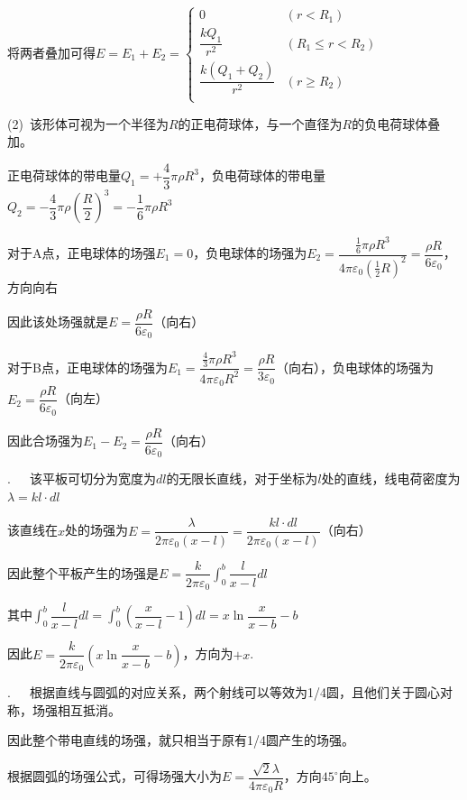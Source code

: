 将两者叠加可得$
    E=E_1+E_2=\begin{cases}
    	0&		\left( r<R_1 \right)\\[3pt]
        \dfrac{kQ_1}{r^2}&		\left( R_1\leq r<R_2 \right)\\[6pt]
    	\dfrac{k(Q_1+Q_2)}{r^2}&		\left( r\geq R_2 \right)\\
    \end{cases}
    $

(2)~该形体可视为一个半径为$R$的正电荷球体，与一个直径为$R$的负电荷球体叠加。

正电荷球体的带电量$Q_1=+\dfrac{4}{3}\pi \rho R^3$，负电荷球体的带电量$Q_2=-\dfrac{4}{3}\pi \rho \left(\dfrac{R}{2}\right)^3=-\dfrac{1}{6}\pi \rho R^3$

对于A点，正电球体的场强$E_1=0$，负电球体的场强为$E_2=\dfrac{\frac{1}{6}\pi \rho R^3}{4\pi\varepsilon_0 (\frac{1}{2}R)^2}=\dfrac{\rho R}{6\varepsilon_0}$，方向向右

因此该处场强就是$E=\dfrac{\rho R}{6\varepsilon_0}$（向右）

对于B点，正电球体的场强为$E_1=\dfrac{\frac{4}{3}\pi\rho R^3}{4\pi \varepsilon_0 R^2}=\dfrac{\rho R}{3\varepsilon_0}$（向右），负电球体的场强为$E_2=\dfrac{\rho R}{6\varepsilon_0}$（向左）

因此合场强为$E_1-E_2=\dfrac{\rho R}{6\varepsilon_0}$（向右）

\noindent\hdashrule{\textwidth}{1pt}{1pt}

.~~~该平板可切分为宽度为$dl$的无限长直线，对于坐标为$l$处的直线，线电荷密度为$\lambda=kl\cdot dl$

该直线在$x$处的场强为$E=\dfrac{\lambda }{2\pi \varepsilon_0 (x-l)}=\dfrac{kl\cdot dl}{2\pi \varepsilon_0 (x-l)}$（向右）

因此整个平板产生的场强是$E=\dfrac{k}{2\pi \varepsilon_0}\displaystyle\int_0^b {\dfrac{l}{x-l}dl}$

其中$\displaystyle\int_0^b {\dfrac{l}{x-l}dl}=\int_0^b\left(\dfrac{x}{x-l}-1\right)dl=x\ln{\dfrac{x}{x-b}}-b$

因此$E=\dfrac{k}{2\pi \varepsilon_0}\left(x\ln{\dfrac{x}{x-b}}-b\right)$，方向为$+x$.

\noindent\hdashrule{\textwidth}{1pt}{1pt}

.~~~根据直线与圆弧的对应关系，两个射线可以等效为1/4圆，且他们关于圆心对称，场强相互抵消。

因此整个带电直线的场强，就只相当于原有1/4圆产生的场强。

根据圆弧的场强公式，可得场强大小为$E=\dfrac{\sqrt{2}\lambda }{4\pi \varepsilon_0 R}$，方向$45^\circ$向上。

